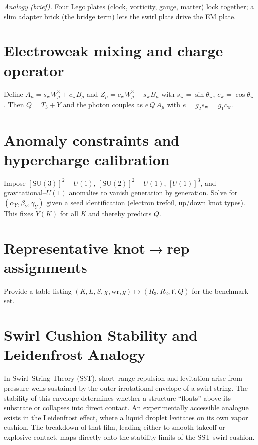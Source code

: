 \documentclass[10pt,reprint,aps,onecolumn,nofootinbib]{revtex4-2}
\begin{document}
        \medskip
        \noindent\emph{Analogy (brief).}
        Four Lego plates (clock, vorticity, gauge, matter) lock together; a slim adapter brick (the bridge term) lets the swirl plate drive the EM plate.


\section{Electroweak mixing and charge operator}\label{app:EWmix}
    Define $A_\mu = s_\mathrm{w} W_\mu^3 + c_\mathrm{w} B_\mu$ and $Z_\mu = c_\mathrm{w} W_\mu^3 - s_\mathrm{w} B_\mu$
    with $s_\mathrm{w}=\sin\theta_\mathrm{w}$, $c_\mathrm{w}=\cos\theta_\mathrm{w}$.
    Then $Q = T_3 + Y$ and the photon couples as $e\,Q\,A_\mu$ with $e=g_2 s_\mathrm{w}=g_1 c_\mathrm{w}$.

\section{Anomaly constraints and hypercharge calibration}\label{app:anomalies}
    Impose $[\mathrm{SU(3)}]^2\!-\!U(1)$, $[\mathrm{SU(2)}]^2\!-\!U(1)$, $[U(1)]^3$, and gravitational–$U(1)$ anomalies to vanish generation by generation.
    Solve for $(\alpha_Y,\beta_Y,\gamma_Y)$ given a seed identification (electron trefoil, up/down knot types).
    This fixes $Y(K)$ for all $K$ and thereby predicts $Q$.

\section{Representative knot\texorpdfstring{$\to$}{→}rep assignments}\label{app:tables}
    Provide a table listing $(K, L, S, \chi, \mathrm{wr}, g) \mapsto (R_3,R_2,Y,Q)$ for the benchmark set.



\section{Swirl Cushion Stability and Leidenfrost Analogy}\label{sec:swirl-cushion-leidenfrost}

    \begin{tcolorbox}[colframe=gray, title={Canonical Context}]
    In Swirl--String Theory (SST), short--range repulsion and levitation arise from
    pressure wells sustained by the outer irrotational envelope of a swirl string.
    The stability of this envelope determines whether a structure ``floats'' above
    its substrate or collapses into direct contact.  An experimentally accessible
    analogue exists in the Leidenfrost effect, where a liquid droplet levitates on
    its own vapor cushion.  The breakdown of that film, leading either to smooth
    takeoff or explosive contact, maps directly onto the stability limits of the
    SST swirl cushion.
    \end{tcolorbox}
\end{document}
